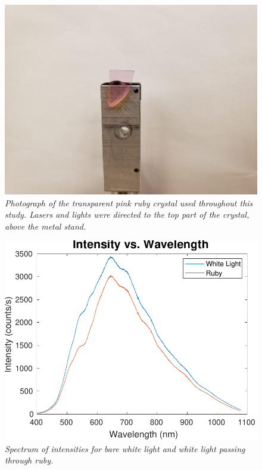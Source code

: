 \documentclass[11pt, a4paper, twocolumn]{article}
\begin{document}
\begin{figure}[]
\includegraphics[width=\linewidth]{rubyPhoto.png}
\caption{\textit{Photograph of the transparent pink ruby crystal used throughout this study. Lasers and lights were directed to the top part of the crystal, above the metal stand.}
}
\label{fig:intensities}
\end{figure}

\begin{figure}[]
\includegraphics[width=\linewidth]{doubleIntensityMeasurement.pdf}
\caption{\textit{Spectrum of intensities for bare white light and white light passing through ruby.}
}
\label{fig:intensities}
\end{figure}
\end{document}
